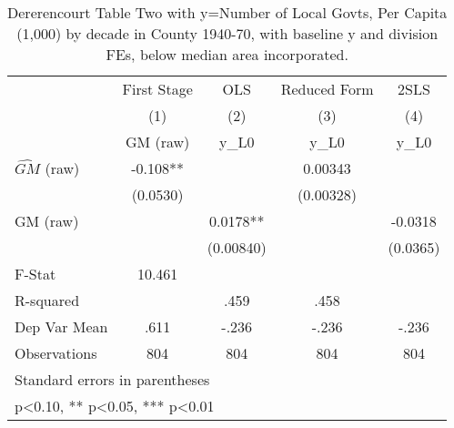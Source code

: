 \begin{table}[htbp]\centering
\def\sym#1{\ifmmode^{#1}\else\(^{#1}\)\fi}
\caption{Dererencourt Table Two with y=Number of Local Govts, Per Capita (1,000) by decade in County 1940-70, with baseline y and division FEs, below median area incorporated.}
\begin{tabular}{l*{4}{c}}
\toprule
                    & First Stage   &         OLS   &Reduced Form   &        2SLS   \\
                    &\multicolumn{1}{c}{(1)}&\multicolumn{1}{c}{(2)}&\multicolumn{1}{c}{(3)}&\multicolumn{1}{c}{(4)}\\
                    &\multicolumn{1}{c}{GM  (raw)}&\multicolumn{1}{c}{y\_L0}&\multicolumn{1}{c}{y\_L0}&\multicolumn{1}{c}{y\_L0}\\
\midrule
$\hat{GM}$ (raw)    &      -0.108** &               &     0.00343   &               \\
                    &    (0.0530)   &               &   (0.00328)   &               \\
\addlinespace
GM  (raw)           &               &      0.0178** &               &     -0.0318   \\
                    &               &   (0.00840)   &               &    (0.0365)   \\
\midrule
F-Stat              &      10.461   &               &               &               \\
R-squared           &               &        .459   &        .458   &               \\
Dep Var Mean        &        .611   &       -.236   &       -.236   &       -.236   \\
Observations        &         804   &         804   &         804   &         804   \\
\bottomrule
\multicolumn{5}{l}{\footnotesize Standard errors in parentheses}\\
\multicolumn{5}{l}{\footnotesize * p<0.10, ** p<0.05, *** p<0.01}\\
\end{tabular}
\end{table}
